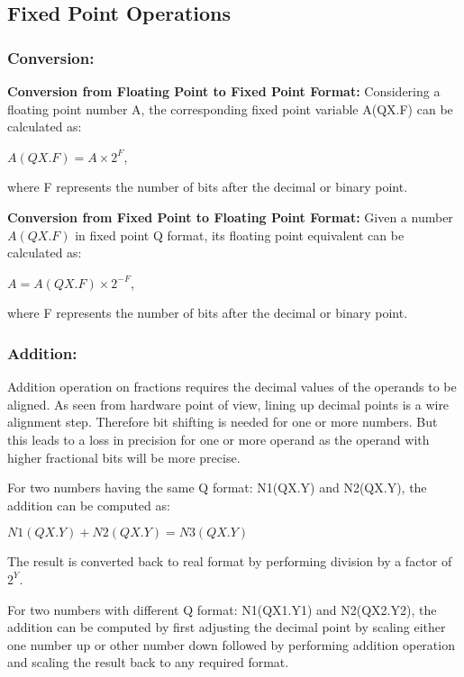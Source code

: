 \subsection{Fixed Point Operations} \label{2.5.3}

\subsubsection{Conversion:}

\noindent \textbf{Conversion from Floating Point to Fixed Point Format:}
Considering a floating point number A, the corresponding fixed point variable A(QX.F) can be calculated as:

\hspace{3cm}$A(QX.F)=A\times 2^{F}$,

\noindent where F represents the number of bits after the decimal or binary point.

\noindent \textbf{Conversion from Fixed Point  to Floating  Point Format:}
Given a number $A(QX.F)$ in fixed point Q format, its floating point equivalent can be calculated as:

\hspace{3cm}$A=A(QX.F)\times 2^{-F}$,

\noindent where F represents the number of bits after the decimal or binary point.

\vspace{0.25cm}
\subsubsection{Addition:}

\noindent Addition operation on fractions requires the decimal values of the operands to be aligned. As seen from hardware point of view, lining up decimal points is a wire alignment step. Therefore bit shifting is needed for one or more numbers. But this leads to a loss in precision for one or more operand as the operand with higher fractional bits will be more precise. 

\vspace{0.25cm}
\noindent For two numbers having the same Q format: N1(QX.Y) and N2(QX.Y), the addition can be computed as:

\hspace{3cm}
$N1(QX.Y)+N2(QX.Y)= N3(QX.Y)$

\noindent The result is converted back to real format by performing division by a factor of $2^{Y}$.

\vspace{0.25cm}
\noindent For two numbers with different Q format: N1(QX1.Y1) and N2(QX2.Y2), the addition can be computed by first adjusting the decimal point by scaling either one number up or other number down followed by performing addition operation and scaling the result back to any required format.

